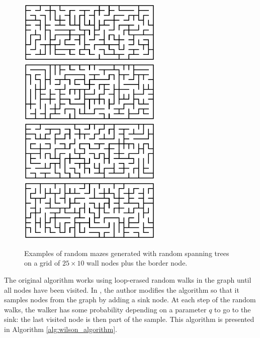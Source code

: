 \documentclass{article}
\begin{document}
\begin{figure}[ht]
\centering
\includegraphics[height=3cm, trim=2cm 2.5cm 2cm 2.5cm, clip]{maze1.eps}
\includegraphics[height=3cm, trim=2cm 2.5cm 2cm 2.5cm, clip]{maze2.eps}
\includegraphics[height=3cm, trim=2cm 2.5cm 2cm 2.5cm, clip]{maze3.eps}
\includegraphics[height=3cm, trim=2cm 2.5cm 2cm 2.5cm, clip]{maze4.eps}
\caption{Examples of random mazes generated with random spanning trees on a grid of $25\times10$ wall nodes plus the border node.}\label{fig:randommazes}
\end{figure}


The original algorithm works using loop-erased random walks in the graph until all nodes have been visited. In \cite{tremblay2017}, the author modifies the algorithm so that it samples nodes from the graph by adding a sink node. At each step of the random walks, the walker has some probability depending on a parameter $q$ to go to the sink: the last visited node is then part of the sample. This algorithm is presented in Algorithm \ref{alg:wilson_algorithm}.
\end{document}
